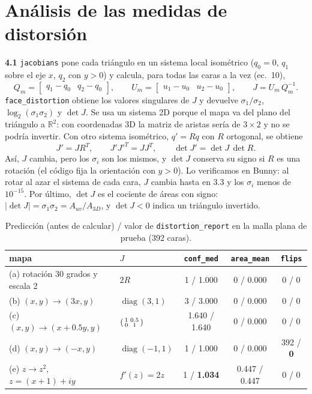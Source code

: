 \documentclass[
	spanish, %
	a4paper, oneside
]{article}
\newcommand{\code}[1]{\texttt{#1}}
\newcommand{\preg}[1]{\textbf{#1}\enspace}
\begin{document}
\section{Análisis de las medidas de distorsión}
\preg{4.1} \code{jacobians} pone cada triángulo en un sistema local isométrico ($q_0=0$, $q_1$ sobre el eje $x$, $q_2$ con $y>0$) y calcula, para todas las caras a la vez (ec.~10),
\[
Q_m=\begin{bmatrix}q_1-q_0 & q_2-q_0\end{bmatrix},\qquad
U_m=\begin{bmatrix}u_1-u_0 & u_2-u_0\end{bmatrix},\qquad
J=U_m\,Q_m^{-1}.
\]
\code{face\_distortion} obtiene los valores singulares de $J$ y devuelve $\sigma_1/\sigma_2$, $\log_2(\sigma_1\sigma_2)$ y $\det J$. Se usa un sistema 2D porque el mapa va del plano del triángulo a $\mathbb{R}^2$: con coordenadas 3D la matriz de aristas sería de $3\times2$ y no se podría invertir. Con otro sistema isométrico, $q'=Rq$ con $R$ ortogonal, se obtiene
\[
J'=JR^T,\qquad J'J'^T=JJ^T,\qquad \det J'=\det J\,\det R.
\]
Así, $J$ cambia, pero los $\sigma_i$ son los mismos, y $\det J$ conserva su signo si $R$ es una rotación (el código fija la orientación con $y>0$). Lo verificamos en Bunny: al rotar al azar el sistema de cada cara, $J$ cambia hasta en 3.3 y los $\sigma_i$ menos de $10^{-15}$. Por último, $\det J$ es el cociente de áreas con signo: $|\det J|=\sigma_1\sigma_2=A_{uv}/A_{3D}$, y $\det J<0$ indica un triángulo invertido.

\begin{table}[h]
\centering\small
\caption{Predicción (antes de calcular) / valor de \code{distortion\_report} en la malla plana de prueba (392 caras).}
\label{tab:p4}
\begin{tabular}{llccc}
\toprule
mapa & $J$ & \code{conf\_med} & \code{area\_mean} & \code{flips} \\
\midrule
(a) rotación 30 grados y escala 2 & $2R$ & 1 / 1.000 & 0 / 0.000 & 0 / 0 \\
(b) $(x,y)\to(3x,y)$ & $\operatorname{diag}(3,1)$ & 3 / 3.000 & 0 / 0.000 & 0 / 0 \\
(c) $(x,y)\to(x+0.5y,y)$ & $\begin{psmallmatrix}1&0.5\\0&1\end{psmallmatrix}$ & 1.640 / 1.640 & 0 / 0.000 & 0 / 0 \\
(d) $(x,y)\to(-x,y)$ & $\operatorname{diag}(-1,1)$ & 1 / 1.000 & 0 / 0.000 & 392 / \textbf{0} \\
(e) $z\to z^2$, $z=(x+1)+iy$ & $f'(z)=2z$ & 1 / \textbf{1.034} & 0.447 / 0.447 & 0 / 0 \\
\bottomrule
\end{tabular}
\end{table}
\end{document}
